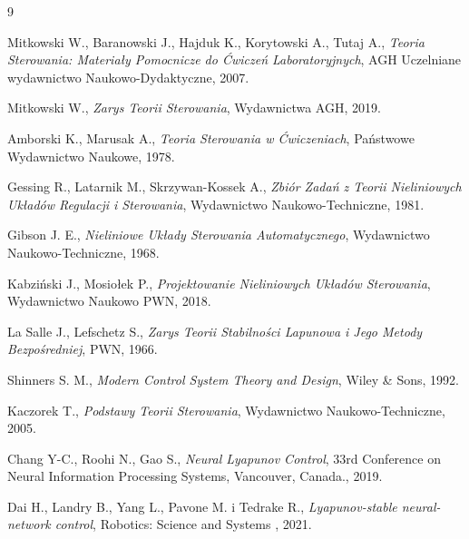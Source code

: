 \documentclass{article}
\begin{document}
\newpage
\begin{thebibliography}{9}

  Mitkowski W., Baranowski J., Hajduk K., Korytowski A., Tutaj A.,
  \emph{Teoria Sterowania: Materiały Pomocnicze do Ćwiczeń Laboratoryjnych},
  AGH Uczelniane wydawnictwo Naukowo-Dydaktyczne,
  2007.

    Mitkowski W.,
    \emph{Zarys Teorii Sterowania},
    Wydawnictwa AGH,
    2019.

  Amborski K., Marusak A.,
  \emph{Teoria Sterowania w Ćwiczeniach},
  Państwowe Wydawnictwo Naukowe,
  1978.

  Gessing R., Latarnik M., Skrzywan-Kossek A.,
  \emph{Zbiór Zadań z Teorii Nieliniowych Układów Regulacji i Sterowania},
  Wydawnictwo Naukowo-Techniczne,
  1981.

  Gibson J. E.,
  \emph{Nieliniowe Układy Sterowania Automatycznego},
  Wydawnictwo Naukowo-Techniczne,
  1968.

  Kabziński J., Mosiołek P.,
  \emph{Projektowanie Nieliniowych Układów Sterowania},
  Wydawnictwo Naukowo PWN,
  2018.

  La Salle J., Lefschetz S.,
  \emph{Zarys Teorii Stabilności Lapunowa i Jego Metody Bezpośredniej},
  PWN,
  1966.

  Shinners S. M.,
  \emph{Modern Control System Theory and Design},
  Wiley \& Sons,
  1992.

  Kaczorek T.,
  \emph{Podstawy Teorii Sterowania},
  Wydawnictwo Naukowo-Techniczne,
  2005.

  Chang Y-C., Roohi N., Gao S., 
  \emph{Neural Lyapunov Control},
  33rd Conference on Neural Information Processing Systems, Vancouver, Canada.,
  2019.

  Dai H., Landry B., Yang L., Pavone M. i Tedrake R.,
  \emph{Lyapunov-stable neural-network control},
  Robotics: Science and Systems ,
  2021.

\end{thebibliography}
\end{document}

